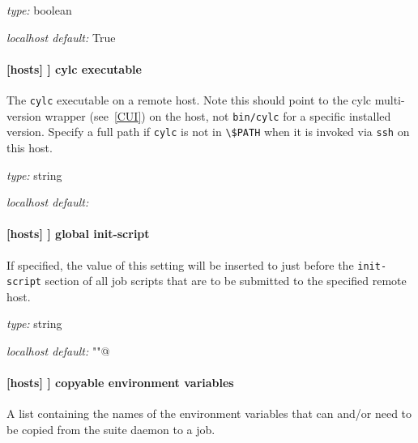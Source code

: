 \begin{myitemize}
\item {\em type:} boolean
\item {\em localhost default:} True
\end{myitemize}

\paragraph[cylc executable]{[hosts] \textrightarrow [[HOST]] \textrightarrow cylc executable }

The \lstinline=cylc= executable on a remote host. Note this should point to the
cylc multi-version wrapper (see~\ref{CUI}) on the host, not
\lstinline=bin/cylc= for a specific installed version.
Specify a full path if \lstinline=cylc= is not in \lstinline=\$PATH= when it is
invoked via \lstinline=ssh= on this host.

\begin{myitemize}
\item {\em type:} string
\item {\em localhost default:} \lstinline@cylc@
\end{myitemize}

\paragraph[global init-script]{[hosts] \textrightarrow [[HOST]] \textrightarrow global init-script }
\label{GlobalInitScript}

If specified, the value of this setting will be inserted to just before the
\lstinline=init-script= section of all job scripts that are to be
submitted to the specified remote host.

\begin{myitemize}
\item {\em type:} string
\item {\em localhost default:} \lstinline@""@
\end{myitemize}

\paragraph[copyable environment variables]{[hosts] \textrightarrow [[HOST]] \textrightarrow copyable environment variables }

A list containing the names of the environment variables that can and/or need
to be copied from the suite daemon to a job.

